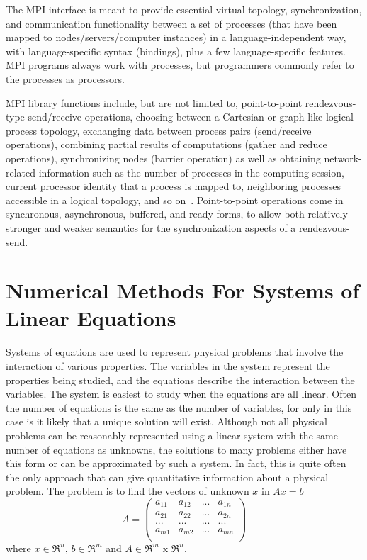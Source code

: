 The MPI interface is meant to provide essential virtual topology, 
synchronization, and communication functionality between a set of processes 
(that have been mapped to nodes/servers/computer instances) in a 
language-independent way, with language-specific syntax (bindings), plus a few 
language-specific features. MPI programs always work with processes, but 
programmers commonly refer to the processes as processors. 

MPI library functions include, but are not limited to, point-to-point 
rendezvous-type send/receive operations, choosing between a Cartesian or 
graph-like logical process topology, exchanging data between process pairs 
(send/receive operations), combining partial results of computations (gather and 
reduce operations), synchronizing nodes (barrier operation) as well as obtaining 
network-related information such as the number of processes in the computing 
session, current processor identity that a process is mapped to, neighboring 
processes accessible in a logical topology, and so on~\cite{wiki_mpi}. Point-to-point operations 
come in synchronous, asynchronous, buffered, and ready forms, to allow both 
relatively stronger and weaker semantics for the synchronization aspects of a 
rendezvous-send.

\section{Numerical Methods For Systems of Linear Equations}
\label{sec:solvers}
Systems of equations are used to represent physical problems that involve the 
interaction of various properties. The variables in the system represent the 
properties being studied, and the equations describe the interaction between the 
variables. The system is easiest to study when the equations are all linear.  
Often the number of equations is the same as the number of variables, for only 
in this case is it likely that a unique solution will exist. Although not all 
physical problems can be reasonably represented using a linear system with the 
same number of equations as unknowns, the solutions to many problems either have 
this form or can be approximated by such a system. In fact, this is quite often 
the only approach that can give quantitative information about a physical 
problem. The problem is to find the vectors of unknown $x$ in $Ax = b$
$$
A=
\begin{pmatrix}
    a_{11}&a_{12}&...&a_{1n}\\
    a_{21}&a_{22}&...&a_{2n}\\
    ...&...&...&...\\
    a_{m1}&a_{m2}&...&a_{mn}\\
\end{pmatrix}
$$
where $x \in \Re^n$, $b \in \Re^m$ and $A \in \Re^m$ x $\Re^n$.

